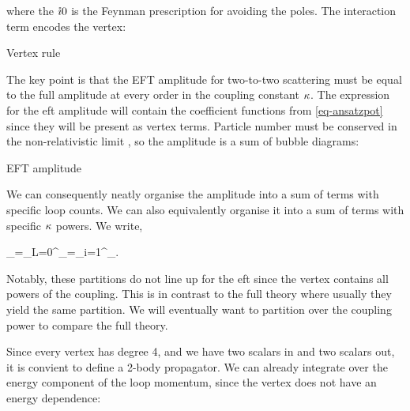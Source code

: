 \documentclass[
  10pt,
  a4paper,
  DIV=11,
  numbers=noendperiod,
  oneside]{scrreprt}
\let\[\relax \let\]\relax %
\DeclareRobustCommand{\[}{\begin{equation}}
\DeclareRobustCommand{\]}{\end{equation}}
\begin{document}
where the \(\mathring{\imath} 0\) is the Feynman prescription for avoiding the poles.
The interaction term encodes the vertex:

\hypertarget{fig-vertex}{}
{
\makeatletter
\def\LT@makecaption#1#2#3{%
  \noalign{\smash{\hbox{\kern\textwidth\rlap{\kern\marginparsep
  \parbox[t]{\marginparwidth}{%
    \footnotesize{%
      \vspace{(1.1\baselineskip)}
    #1{#2: }\ignorespaces #3}}}}}}%
    }
\makeatother



\label{fig-vertex}Vertex rule

}

The key point is that the EFT amplitude for two-to-two scattering must
be equal to the full amplitude at every order in the coupling constant
\(\kappa\). The expression for the \gls{eft} amplitude will contain
the coefficient functions from \ref{eq-ansatzpot} since they will be
present as vertex terms. Particle number must be conserved in the
non-relativistic limit , so the amplitude is a sum of bubble diagrams:

\hypertarget{fig-eftampl}{}
{
\makeatletter
\def\LT@makecaption#1#2#3{%
  \noalign{\smash{\hbox{\kern\textwidth\rlap{\kern\marginparsep
  \parbox[t]{\marginparwidth}{%
    \footnotesize{%
      \vspace{(1.1\baselineskip)}
    #1{#2: }\ignorespaces #3}}}}}}%
    }
\makeatother



\label{fig-eftampl}EFT amplitude

}

We can consequently neatly organise the amplitude into a sum of terms
with specific loop counts. We can also equivalently organise it into a
sum of terms with specific \(\kappa\) powers. We write,

\[\ampl_=\sum\limits_{L=0}^\infty{}_=\sum\limits_{i=1}^\infty \ampl[(i)]_.\]

Notably, these partitions do not line up for the \gls{eft} since the
vertex contains all powers of the coupling. This is in contrast to the
full theory where usually they yield the same partition. We will
eventually want to partition over the coupling power to compare the full
theory.

Since every vertex has degree 4, and we have two scalars in and two
scalars out, it is convient to define a 2-body propagator. We can
already integrate over the energy component of the loop momentum, since
the vertex does not have an energy dependence:
\end{document}
